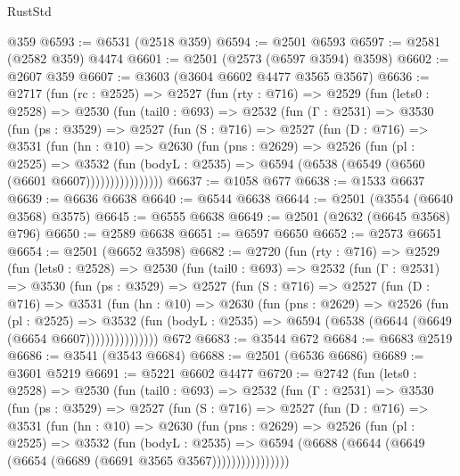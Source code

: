\begin{lexlean}{RustStd}
\begin{coremodule}
{\begin{coremodule}
{{{{{{{{{{{{{{{{{{{{    @359
@6593 := @6531 (@2518 @359)
@6594 := @2501 @6593
@6597 := @2581 (@2582 @359) @4474
@6601 := @2501 (@2573 (@6597 @3594) @3598)
@6602 := @2607 @359
@6607 := @3603 (@3604 @6602 @4477 @3565 @3567)
@6636 := @2717
    (fun (rc : @2525) =>
    @2527
      (fun (rty : @716) =>
      @2529
        (fun (lets0 : @2528) =>
        @2530
          (fun (tail0 : @693) =>
          @2532
            (fun (Γ : @2531) =>
            @3530
              (fun (ps : @3529) =>
              @2527
                (fun (S : @716) =>
                @2527
                  (fun (D : @716) =>
                  @3531
                    (fun (hn : @10) =>
                    @2630
                      (fun (pns : @2629) =>
                      @2526
                        (fun (pl : @2525) =>
                        @3532
                          (fun (bodyL : @2535) =>
                          @6594 (@6538 (@6549 (@6560 (@6601 @6607))))))))))))))))
@6637 := @1058 @677
@6638 := @1533 @6637
@6639 := @6636 @6638
@6640 := @6544 @6638
@6644 := @2501 (@3554 (@6640 @3568) @3575)
@6645 := @6555 @6638
@6649 := @2501 (@2632 (@6645 @3568) @796)
@6650 := @2589 @6638
@6651 := @6597 @6650
@6652 := @2573 @6651
@6654 := @2501 (@6652 @3598)
@6682 := @2720
    (fun (rty : @716) =>
    @2529
      (fun (lets0 : @2528) =>
      @2530
        (fun (tail0 : @693) =>
        @2532
          (fun (Γ : @2531) =>
          @3530
            (fun (ps : @3529) =>
            @2527
              (fun (S : @716) =>
              @2527
                (fun (D : @716) =>
                @3531
                  (fun (hn : @10) =>
                  @2630
                    (fun (pns : @2629) =>
                    @2526
                      (fun (pl : @2525) =>
                      @3532
                        (fun (bodyL : @2535) =>
                        @6594 (@6538 (@6644 (@6649 (@6654 @6607)))))))))))))))
    @672
@6683 := @3544 @672
@6684 := @6683 @2519
@6686 := @3541 (@3543 @6684)
@6688 := @2501 (@6536 @6686)
@6689 := @3601 @5219
@6691 := @5221 @6602 @4477
@6720 := @2742
    (fun (lets0 : @2528) =>
    @2530
      (fun (tail0 : @693) =>
      @2532
        (fun (Γ : @2531) =>
        @3530
          (fun (ps : @3529) =>
          @2527
            (fun (S : @716) =>
            @2527
              (fun (D : @716) =>
              @3531
                (fun (hn : @10) =>
                @2630
                  (fun (pns : @2629) =>
                  @2526
                    (fun (pl : @2525) =>
                    @3532
                      (fun (bodyL : @2535) =>
                      @6594 (@6688 (@6644 (@6649 (@6654 (@6689 (@6691 @3565 @3567))))))))))))))))
}}}}}}}}}}}}}}}}}}}}
\end{coremodule}}
\end{coremodule}
\end{lexlean}
